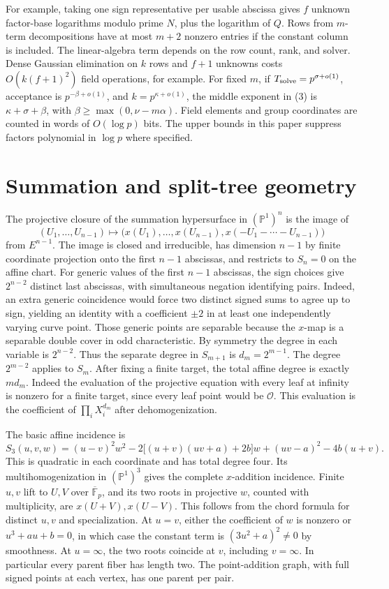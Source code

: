 \documentclass[11pt]{article}
\newcommand{\kb}{\overline{\mathbb F}_p}
\newcommand{\OO}{\mathcal O}
\newcommand{\Pj}{\mathbb P}
\begin{document}
For example, taking one sign representative per usable abscissa gives \(f\) unknown factor-base logarithms modulo prime \(N\), plus the logarithm of \(Q\). Rows from \(m\)-term decompositions have at most \(m+2\) nonzero entries if the constant column is included. The linear-algebra term depends on the row count, rank, and solver. Dense Gaussian elimination on \(k\) rows and \(f+1\) unknowns costs \(O(k(f+1)^2)\) field operations, for example. For fixed \(m\), if \(T_{\rm solve}=p^{\sigma+o(1)}\), acceptance is \(p^{-\beta+o(1)}\), and \(k=p^{\kappa+o(1)}\), the middle exponent in (3) is \(\kappa+\sigma+\beta\), with \(\beta\ge\max(0,\nu-m\alpha)\). Field elements and group coordinates are counted in words of \(O(\log p)\) bits. The upper bounds in this paper suppress factors polynomial in \(\log p\) where specified.

\section{Summation and split-tree geometry}

The projective closure of the summation hypersurface in \((\Pj^1)^n\) is the image of
\[
(U_1,\ldots,U_{n-1})\longmapsto
\bigl(x(U_1),\ldots,x(U_{n-1}),x(-U_1-\cdots-U_{n-1})\bigr)
\]
from \(E^{n-1}\). The image is closed and irreducible, has dimension \(n-1\) by finite coordinate projection onto the first \(n-1\) abscissas, and restricts to \(S_n=0\) on the affine chart. For generic values of the first \(n-1\) abscissas, the sign choices give \(2^{n-2}\) distinct last abscissas, with simultaneous negation identifying pairs. Indeed, an extra generic coincidence would force two distinct signed sums to agree up to sign, yielding an identity with a coefficient \(\pm2\) in at least one independently varying curve point. Those generic points are separable because the \(x\)-map is a separable double cover in odd characteristic. By symmetry the degree in each variable is \(2^{n-2}\). Thus the separate degree in \(S_{m+1}\) is \(d_m=2^{m-1}\). The degree \(2^{m-2}\) applies to \(S_m\). After fixing a finite target, the total affine degree is exactly \(m d_m\). Indeed the evaluation of the projective equation with every leaf at infinity is nonzero for a finite target, since every leaf point would be \(\OO\). This evaluation is the coefficient of \(\prod_i X_i^{d_m}\) after dehomogenization. \cite{semaev}

The basic affine incidence is
\[
S_3(u,v,w)=(u-v)^2w^2-2\bigl[(u+v)(uv+a)+2b\bigr]w
 +(uv-a)^2-4b(u+v).
\tag{4}
\]
This is quadratic in each coordinate and has total degree four. Its multihomogenization in \((\Pj^1)^3\) gives the complete \(x\)-addition incidence. Finite \(u,v\) lift to \(U,V\) over \(\kb\), and its two roots in projective \(w\), counted with multiplicity, are \(x(U+V),x(U-V)\). This follows from the chord formula for distinct \(u,v\) and specialization. At \(u=v\), either the coefficient of \(w\) is nonzero or \(u^3+au+b=0\), in which case the constant term is \((3u^2+a)^2\ne0\) by smoothness. At \(u=\infty\), the two roots coincide at \(v\), including \(v=\infty\). In particular every parent fiber has length two. The point-addition graph, with full signed points at each vertex, has one parent per pair.
\end{document}
